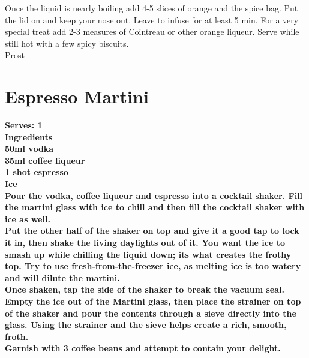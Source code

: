 \documentclass[18pt, oneside]{book}
\begin{document}
Once the liquid is nearly boiling add 4-5 slices of orange and the spice bag. Put the lid on and keep your nose out. Leave to infuse for at least 5 min. For a very special treat add 2-3 measures of Cointreau or other orange liqueur. Serve while still hot with a few spicy biscuits. \\

Prost

\section{Espresso Martini}
\bf{Serves: 1} \\

\bf{Ingredients} \normalfont \\ 
50ml vodka \\
35ml coffee liqueur \\
1 shot  espresso \\
Ice \\


Pour the vodka, coffee liqueur and espresso into a cocktail shaker.  Fill the martini glass with ice to chill and then fill the cocktail shaker with ice as well.\\

Put the other half of the shaker on top and give it a good tap to lock it in, then shake the living daylights out of it. You want the ice to smash up while chilling the liquid down; its what creates the frothy top. Try to use fresh-from-the-freezer ice, as melting ice is too watery and will dilute the martini.\\

Once shaken, tap the side of the shaker to break the vacuum seal. Empty the ice out of the Martini glass, then place the strainer on top of the shaker and pour the contents through a sieve directly into the glass. Using the strainer and the sieve helps create a rich, smooth, froth.\\

Garnish with 3 coffee beans and attempt to contain your delight.
 
\end{document}
